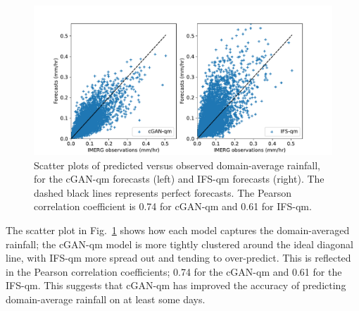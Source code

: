 \documentclass{article}
\begin{document}
\begin{figure}
\centering

    \centering
     \includegraphics[width=\textwidth]{images/scatter_mean_final-nologs_217600.pdf}
     \caption{Scatter plots of predicted versus observed domain-average rainfall, for the cGAN-qm forecasts (left) and IFS-qm forecasts (right). The dashed black lines represents perfect forecasts. The Pearson correlation coefficient is 0.74 for cGAN-qm and 0.61 for IFS-qm.}
     \label{fig:scatter}
\end{figure}

The scatter plot in Fig.~\ref{fig:scatter} shows how each model captures the domain-averaged rainfall; the cGAN-qm model is more tightly clustered around the ideal diagonal line, with IFS-qm more spread out and tending to over-predict. This is reflected in the Pearson correlation coefficients; 0.74 for the cGAN-qm and 0.61 for the IFS-qm. This suggests that cGAN-qm has improved the accuracy of predicting domain-average rainfall on at least some days.
\end{document}
